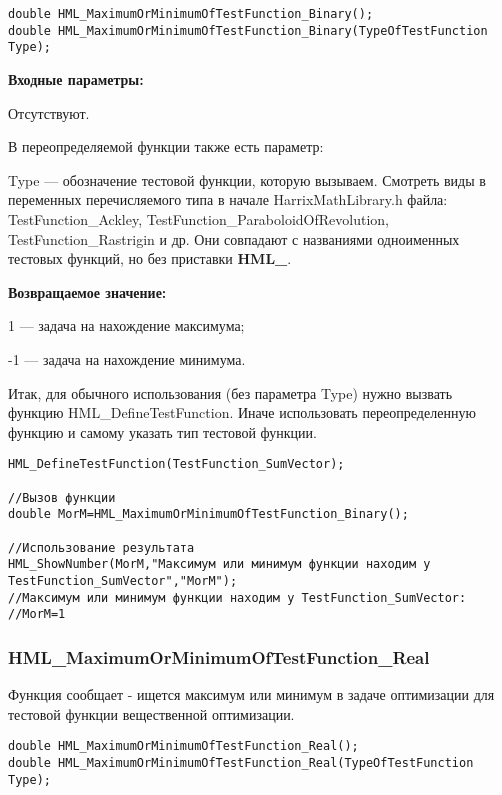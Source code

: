 \documentclass[a4paper,12pt]{article}
\begin{document}
\begin{lstlisting}[label=code_syntax_HML_MaximumOrMinimumOfTestFunction_Binary,caption=Синтаксис]
double HML_MaximumOrMinimumOfTestFunction_Binary();
double HML_MaximumOrMinimumOfTestFunction_Binary(TypeOfTestFunction Type);
\end{lstlisting}

\textbf{Входные параметры:}

Отсутствуют.

В переопределяемой функции также есть параметр:
  
Type --- обозначение тестовой функции, которую вызываем.
Смотреть виды в переменных перечисляемого типа в начале HarrixMathLibrary.h файла: TestFunction\_Ackley, TestFunction\_ParaboloidOfRevolution, TestFunction\_Rastrigin и др. Они совпадают с названиями одноименных тестовых функций, но без приставки \textbf{HML\_}.

\textbf{Возвращаемое значение:}
 
1 --- задача на нахождение максимума;

-1 --- задача на нахождение минимума.

Итак, для обычного использования (без параметра Type) нужно вызвать функцию HML\_DefineTestFunction. Иначе использовать переопределенную функцию и самому указать тип тестовой функции.


\begin{lstlisting}[label=code_use_HML_MaximumOrMinimumOfTestFunction_Binary,caption=Пример использования]
HML_DefineTestFunction(TestFunction_SumVector);

//Вызов функции
double MorM=HML_MaximumOrMinimumOfTestFunction_Binary();

//Использование результата
HML_ShowNumber(MorM,"Максимум или минимум функции находим у TestFunction_SumVector","MorM");
//Максимум или минимум функции находим у TestFunction_SumVector:
//MorM=1
\end{lstlisting}

\subsubsection{HML\_MaximumOrMinimumOfTestFunction\_Real}\label{HML_MaximumOrMinimumOfTestFunction_Real}

	Функция сообщает - ищется максимум или минимум в задаче оптимизации для тестовой функции вещественной оптимизации.


\begin{lstlisting}[label=code_syntax_HML_MaximumOrMinimumOfTestFunction_Real,caption=Синтаксис]
double HML_MaximumOrMinimumOfTestFunction_Real();
double HML_MaximumOrMinimumOfTestFunction_Real(TypeOfTestFunction Type);
\end{lstlisting}
\end{document}
